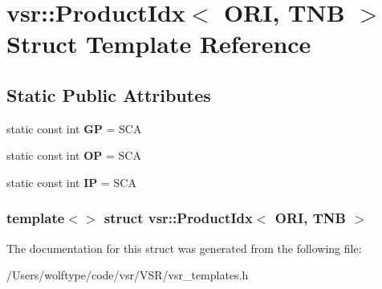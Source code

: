 \hypertarget{structvsr_1_1_product_idx_3_01_o_r_i_00_01_t_n_b_01_4}{\section{vsr\-:\-:Product\-Idx$<$ O\-R\-I, T\-N\-B $>$ Struct Template Reference}
\label{structvsr_1_1_product_idx_3_01_o_r_i_00_01_t_n_b_01_4}
}
\subsection*{Static Public Attributes}
\begin{DoxyCompactItemize}
\item 
\hypertarget{structvsr_1_1_product_idx_3_01_o_r_i_00_01_t_n_b_01_4_a92eb3dafbe9aa866026bb06e885578dd}{static const int {\bfseries G\-P} = S\-C\-A}\label{structvsr_1_1_product_idx_3_01_o_r_i_00_01_t_n_b_01_4_a92eb3dafbe9aa866026bb06e885578dd}

\item 
\hypertarget{structvsr_1_1_product_idx_3_01_o_r_i_00_01_t_n_b_01_4_a19946037a00e242a9977ff32cc80a02a}{static const int {\bfseries O\-P} = S\-C\-A}\label{structvsr_1_1_product_idx_3_01_o_r_i_00_01_t_n_b_01_4_a19946037a00e242a9977ff32cc80a02a}

\item 
\hypertarget{structvsr_1_1_product_idx_3_01_o_r_i_00_01_t_n_b_01_4_a268bf1fa6fc53d7cf38afb6000d8c1ec}{static const int {\bfseries I\-P} = S\-C\-A}\label{structvsr_1_1_product_idx_3_01_o_r_i_00_01_t_n_b_01_4_a268bf1fa6fc53d7cf38afb6000d8c1ec}

\end{DoxyCompactItemize}
\subsubsection*{template$<$$>$ struct vsr\-::\-Product\-Idx$<$ O\-R\-I, T\-N\-B $>$}



The documentation for this struct was generated from the following file\-:\begin{DoxyCompactItemize}
\item 
/\-Users/wolftype/code/vsr/\-V\-S\-R/vsr\-\_\-templates.\-h\end{DoxyCompactItemize}
